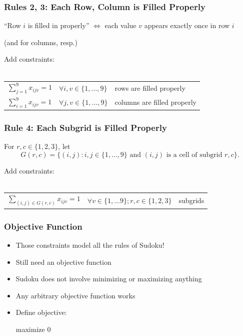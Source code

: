 \documentclass{beamer}
\newcommand{\stanza}{ \\~\ }
\begin{document}
\begin{frame} \frametitle{Rules 2, 3: Each Row, Column is Filled Properly}

\begin{center}
  ``Row $i$ is filled in properly'' $\Leftrightarrow$ each value $v$ appears exactly once in row $i$

  (and for columns, resp.)
\end{center}

Add constraints:
\stanza

  \begin{tabular}{lll}
    $\sum_{j=1}^9 x_{ijv} = 1$ & $\forall i, v \in \{1, \ldots, 9\}$ & rows are filled properly \\
    $\sum_{i=1}^9 x_{ijv} = 1$ & $\forall j, v \in \{1, \ldots, 9\}$ & columns are filled properly
  \end{tabular}
\end{frame}

\begin{frame} \frametitle{Rule 4: Each Subgrid is Filled Properly}

  For $r, c \in \{1, 2, 3\}$, let
  \[ G(r, c) = \{
  (i, j) : i, j \in \{1, \ldots, 9\}
  \text{ and } (i, j)
  \text{ is a cell of subgrid } r, c
  \} . \]

  Add constraints:
  \stanza
  \begin{tabular}{lll}
    $\sum_{(i, j) \in G(r, c)} x_{ijv} = 1$ & $\forall v \in \{1, \ldots 9\}; r,c \in \{1, 2, 3\}$ & subgrids
  \end{tabular}
  
\end{frame}

\begin{frame} \frametitle{Objective Function}
  \begin{itemize}
    \item Those constraints model all the rules of Sudoku!
    \item Still need an objective function
    \item Sudoku does not involve minimizing or maximizing anything
    \item Any arbitrary objective function works
    \item Define objective:

      maximize 0

  \end{itemize}
\end{frame}
\end{document}
